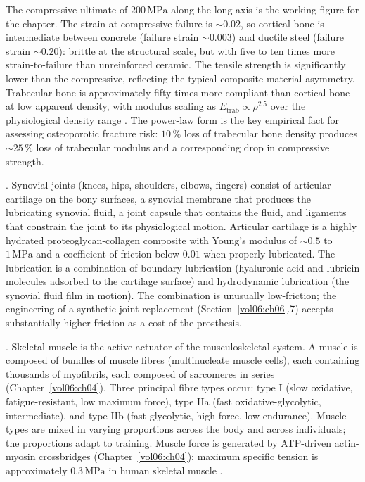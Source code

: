 The compressive ultimate of $200\,\text{MPa}$ along the long axis is
the working figure for the chapter. The strain at compressive failure
is $\sim 0.02$, so cortical bone is intermediate between concrete
(failure strain $\sim 0.003$) and ductile steel (failure strain
$\sim 0.20$): brittle at the structural scale, but with five to ten
times more strain-to-failure than unreinforced ceramic. The tensile
strength is significantly lower than the compressive, reflecting the
typical composite-material asymmetry. Trabecular bone is approximately
fifty times more compliant than cortical bone at low apparent
density, with modulus scaling as
$E_{\text{trab}} \propto \rho^{2.5}$ over the physiological density
range \cite[Tab.~3.1]{paper:v6c06-hayes-1991}. The power-law form is
the key empirical fact for assessing osteoporotic fracture risk:
$10\,\%$ loss of trabecular bone density produces $\sim 25\,\%$ loss
of trabecular modulus and a corresponding drop in compressive
strength.

. Synovial joints (knees, hips, shoulders, elbows,
fingers) consist of articular cartilage on the bony surfaces, a
synovial membrane that produces the lubricating synovial fluid, a
joint capsule that contains the fluid, and ligaments that constrain
the joint to its physiological motion. Articular cartilage is a
highly hydrated proteoglycan-collagen composite with Young's modulus
of $\sim 0.5$ to $1\,\text{MPa}$ and a coefficient of friction below
$0.01$ when properly lubricated. The lubrication is a combination of
boundary lubrication (hyaluronic acid and lubricin molecules adsorbed
to the cartilage surface) and hydrodynamic lubrication (the synovial
fluid film in motion). The combination is unusually low-friction; the
engineering of a synthetic joint replacement (Section~\ref{vol06:ch06}.7)
accepts substantially higher friction as a cost of the prosthesis.

. Skeletal muscle is the active actuator of the
musculoskeletal system. A muscle is composed of bundles of muscle
fibres (multinucleate muscle cells), each containing thousands of
myofibrils, each composed of sarcomeres in series
(Chapter~\ref{vol06:ch04}). Three principal fibre types occur: type
I (slow oxidative, fatigue-resistant, low maximum force), type IIa
(fast oxidative-glycolytic, intermediate), and type IIb (fast
glycolytic, high force, low endurance). Muscle types are mixed in
varying proportions across the body and across individuals; the
proportions adapt to training. Muscle force is generated by
ATP-driven actin-myosin crossbridges (Chapter~\ref{vol06:ch04});
maximum specific tension is approximately $0.3\,\text{MPa}$ in
human skeletal muscle \cite[p.~578]{paper:v6c06-bottinelli-1996}.

